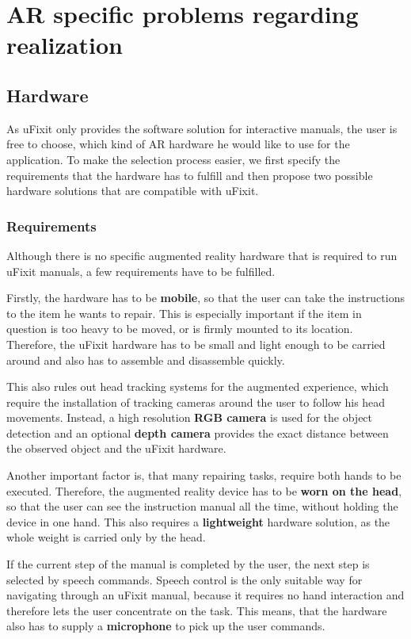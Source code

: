 
\chapter{AR specific problems regarding realization}

\section{Hardware}
\label{sec:hardware}
As uFixit only provides the software solution for interactive manuals, the user is free to choose, which kind of AR hardware he would like to use for the application. To make the selection process easier, we first specify the requirements that the hardware has to fulfill and then propose two possible hardware solutions that are compatible with uFixit.

\subsection{Requirements}
Although there is no specific augmented reality hardware that is required to run uFixit manuals, a few requirements have to be fulfilled.

Firstly, the hardware has to be \textbf{mobile}, so that the user can take the instructions to the item he wants to repair. This is especially important if the item in question is too heavy to be moved, or is firmly mounted to its location. Therefore, the uFixit hardware has to be small and light enough to be carried around and also has to assemble and disassemble quickly.

This also rules out head tracking systems for the augmented experience, which require the installation of tracking cameras around the user to follow his head movements. Instead, a high resolution \textbf{RGB camera} is used for the object detection and an optional \textbf{depth camera} provides the exact distance between the observed object and the uFixit hardware.

Another important factor is, that many repairing tasks, require both hands to be executed. Therefore, the augmented reality device has to be \textbf{worn on the head}, so that the user can see the instruction manual all the time, without holding the device in one hand. This also requires a \textbf{lightweight} hardware solution, as the whole weight is carried only by the head.

If the current step of the manual is completed by the user, the next step is selected by speech commands. Speech control is the only suitable way for navigating through an uFixit manual, because it requires no hand interaction and therefore lets the user concentrate on the task. This means, that the hardware also has to supply a \textbf{microphone} to pick up the user commands.

